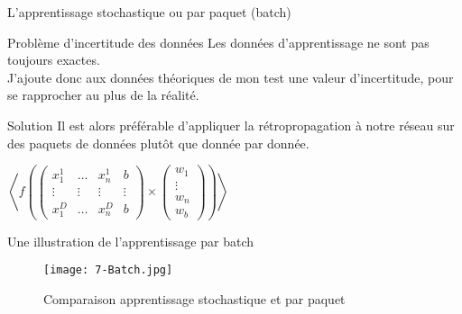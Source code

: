 \begin{frame}{L'apprentissage stochastique ou par paquet (batch)}
    \begin{alertblock}{Problème d'incertitude des données}
        Les données d'apprentissage ne sont pas toujours exactes. \\
        J'ajoute donc aux données théoriques de mon test une valeur d'incertitude, pour se rapprocher au plus de la réalité. 
    \end{alertblock}
    \begin{exampleblock}{Solution}
        Il est alors préférable d'appliquer la rétropropagation à notre réseau sur des paquets de données plutôt que donnée par donnée. 
    \end{exampleblock}
    \begin{center}
        \centering
        $
            \left< f
            \left(
            \begin{pmatrix}
                    x_1^{1} & \ldots & x_n^{1} & b      \\
                    \vdots  & \vdots & \vdots  & \vdots \\
                    x_1^{D} & \ldots & x_n^{D} & b
                \end{pmatrix}
            \times
            \begin{pmatrix}
                    w_1    \\
                    \vdots \\
                    w_n    \\
                    w_b
                \end{pmatrix}
            \right) \right>
        $
    \end{center}
\end{frame}


\begin{frame}{Une illustration de l'apprentissage par batch}
    \begin{figure}
        \centering
        \texttt{[image: 7-Batch.jpg]}
        \caption{Comparaison apprentissage stochastique et par paquet}
    \end{figure}
\end{frame}
